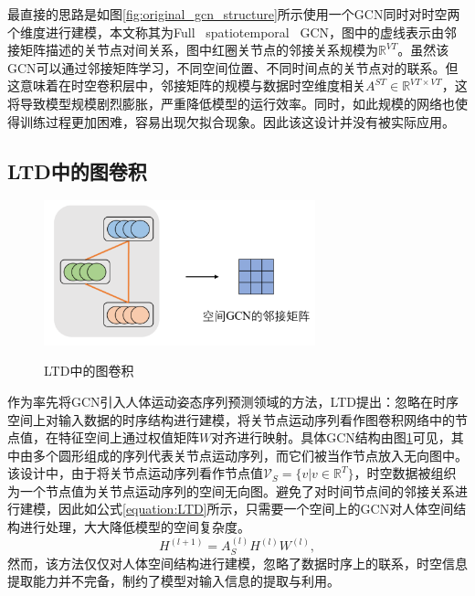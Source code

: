 最直接的思路是如图\ref{fig:original_gcn_structure}所示使用一个GCN同时对时空两个维度进行建模，本文称其为Full \ spatiotemporal \ GCN，图中的虚线表示由邻接矩阵描述的关节点对间关系，图中红圈关节点的邻接关系规模为$\mathbb{R}^{VT}$。虽然该GCN可以通过邻接矩阵学习，不同空间位置、不同时间点的关节点对的联系。但这意味着在时空卷积层中，邻接矩阵的规模与数据时空维度相关${A}^{ST} \in \mathbb{R}^{VT\times VT}$，这将导致模型规模剧烈膨胀，严重降低模型的运行效率。同时，如此规模的网络也使得训练过程更加困难，容易出现欠拟合现象。因此该这设计并没有被实际应用。

\subsection{LTD中的图卷积}
\begin{figure}[ht]
    \centering
    \includegraphics[width=0.7\textwidth]{FigMa/LTD_gcn.png}\\
    \vspace{-0.3cm}
    \caption{LTD中的图卷积}
    \label{fig:LTD_gcn_structure}
\end{figure}

作为率先将GCN引入人体运动姿态序列预测领域的方法，LTD提出：忽略在时序空间上对输入数据的时序结构进行建模，将关节点运动序列看作图卷积网络中的节点值，在特征空间上通过权值矩阵$W$对齐进行映射。具体GCN结构由图\ref{fig:LTD_gcn_structure}可见，其中由多个圆形组成的序列代表关节点运动序列，而它们被当作节点放入无向图中。该设计中，由于将关节点运动序列看作节点值$\mathcal{V}_S = \{v | v \in \mathbb{R}^{T} \}$，时空数据被组织为一个节点值为关节点运动序列的空间无向图。避免了对时间节点间的邻接关系进行建模，因此如公式\ref{equation:LTD}所示，只需要一个空间上的GCN对人体空间结构进行处理，大大降低模型的空间复杂度。
\begin{equation}
    {H}^{(l+1)}= {A}_{S}^{(l)}{H}^{(l)}{W}^{(l)},
    \label{equation:LTD}
\end{equation}
然而，该方法仅仅对人体空间结构进行建模，忽略了数据时序上的联系，时空信息提取能力并不完备，制约了模型对输入信息的提取与利用。

